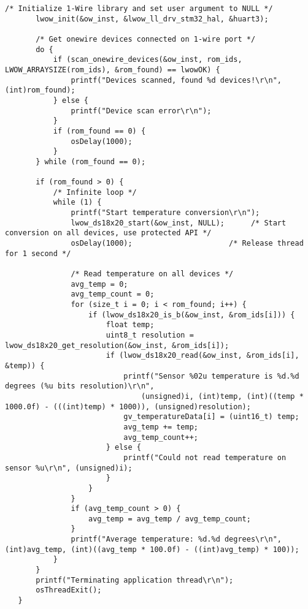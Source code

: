 \begin{lstlisting}[label=lst:tempApp,caption={Main code for Temperature App.}]
       /* Initialize 1-Wire library and set user argument to NULL */
       lwow_init(&ow_inst, &lwow_ll_drv_stm32_hal, &huart3);
   
       /* Get onewire devices connected on 1-wire port */
       do {
           if (scan_onewire_devices(&ow_inst, rom_ids, LWOW_ARRAYSIZE(rom_ids), &rom_found) == lwowOK) {
               printf("Devices scanned, found %d devices!\r\n", (int)rom_found);
           } else {
               printf("Device scan error\r\n");
           }
           if (rom_found == 0) {
               osDelay(1000);
           }
       } while (rom_found == 0);
   
       if (rom_found > 0) {
           /* Infinite loop */
           while (1) {
               printf("Start temperature conversion\r\n");
               lwow_ds18x20_start(&ow_inst, NULL);      /* Start conversion on all devices, use protected API */
               osDelay(1000);                      /* Release thread for 1 second */
   
               /* Read temperature on all devices */
               avg_temp = 0;
               avg_temp_count = 0;
               for (size_t i = 0; i < rom_found; i++) {
                   if (lwow_ds18x20_is_b(&ow_inst, &rom_ids[i])) {
                       float temp;
                       uint8_t resolution = lwow_ds18x20_get_resolution(&ow_inst, &rom_ids[i]);
                       if (lwow_ds18x20_read(&ow_inst, &rom_ids[i], &temp)) {
                           printf("Sensor %02u temperature is %d.%d degrees (%u bits resolution)\r\n",
                               (unsigned)i, (int)temp, (int)((temp * 1000.0f) - (((int)temp) * 1000)), (unsigned)resolution);
                           gv_temperatureData[i] = (uint16_t) temp;
                           avg_temp += temp;
                           avg_temp_count++;
                       } else {
                           printf("Could not read temperature on sensor %u\r\n", (unsigned)i);
                       }
                   }
               }
               if (avg_temp_count > 0) {
                   avg_temp = avg_temp / avg_temp_count;
               }
               printf("Average temperature: %d.%d degrees\r\n", (int)avg_temp, (int)((avg_temp * 100.0f) - ((int)avg_temp) * 100));
           }
       }
       printf("Terminating application thread\r\n");
       osThreadExit();
   }
\end{lstlisting}



